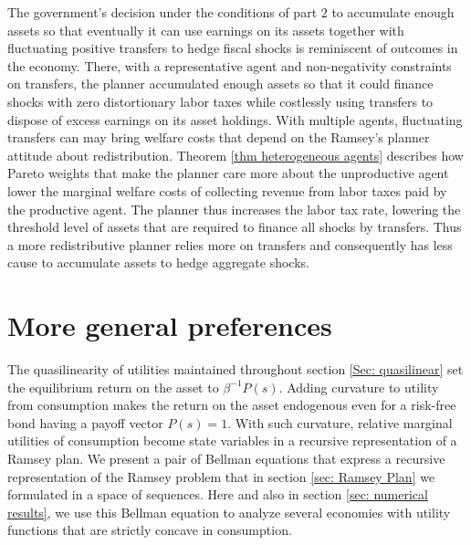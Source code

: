 \documentclass[thmsb,11pt]{article}
\begin{document}
The government's decision under the conditions of part 2  to accumulate enough  assets so that
 eventually it can use earnings on its assets together with fluctuating positive  transfers to hedge fiscal shocks is reminiscent of outcomes in the \cite{Aiyagari2002} economy. There, with a representative agent and non-negativity constraints on transfers, the planner
accumulated enough assets so that it could finance shocks with zero distortionary labor taxes while costlessly using transfers
to dispose of excess earnings on its asset holdings. With multiple agents, fluctuating transfers can may bring welfare costs that  depend on
the Ramsey's planner attitude about  redistribution. Theorem \ref{thm heterogeneous agents} describes how Pareto weights that  make the planner care more about the unproductive agent lower the marginal welfare costs of collecting revenue from labor taxes paid by the productive agent. The planner thus increases the labor tax rate, lowering the threshold level of assets that are required to finance all shocks by transfers. Thus a more redistributive planner relies more on transfers and consequently has less cause to accumulate assets to hedge aggregate shocks.

\color{black}

\section{More general preferences}
\label{Sec: more general economies}
The quasilinearity of utilities maintained throughout  section \ref{Sec: quasilinear} set  the equilibrium  return on the asset to $\beta^{-1}P(s)$.
Adding curvature to utility from consumption  makes the  return on the asset   endogenous even for a risk-free bond having a payoff vector $P(s)=1$.
With such curvature, relative marginal utilities of consumption become state variables in a recursive representation of a Ramsey plan.
We  present a pair of Bellman equations that express a recursive representation of the Ramsey problem that in section \ref{sec: Ramsey Plan}
 we formulated in a space of sequences. Here  and also in section  \ref{sec: numerical results}, we  use this Bellman equation to analyze
several economies  with utility functions that are strictly concave in consumption.
\end{document}
